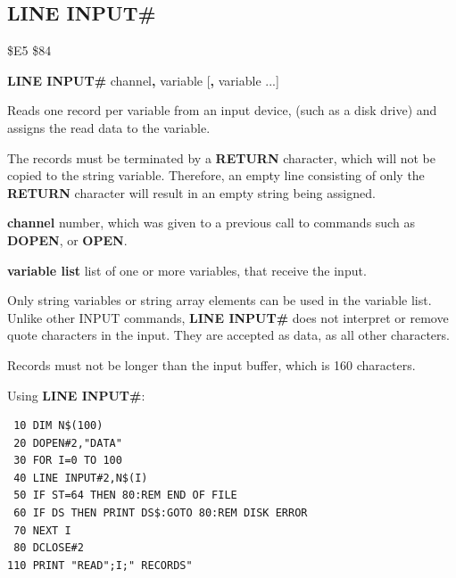 
\newpage
\subsection{LINE INPUT\#}
\begin{description}[leftmargin=2cm,style=nextline]
\item [Token:] \$E5 \$84
\item [Format:] {\bf LINE INPUT\#} channel{\bf,} variable [{\bf,} variable ...]
\item [Usage:] Reads one record per variable from an input device,
               (such as a disk drive)
               and assigns the read data to the variable.

               The records must be terminated by a {\bf RETURN}
               character, which will not be copied to the string variable.
               Therefore, an empty line consisting of only the {\bf RETURN} character
               will result in an empty string being assigned.

               {\bf channel} number, which was given to a previous
               call to commands such as {\bf DOPEN}, or {\bf OPEN}.

               {\bf variable list} list of one or more
               variables, that receive the input.

\item [Remarks:] Only string variables or string array elements
                 can be used in the variable list.
                 Unlike other INPUT commands, {\bf LINE INPUT\#} does
                 not interpret or remove quote characters in the input.
                 They are accepted as data, as all other characters.

                 Records must not be longer than the input buffer, which is 160 characters.

\item [Example:] Using {\bf LINE INPUT\#}:
\begin{tcolorbox}[colback=black,coltext=white]
\verbatimfont{\codefont}
\begin{verbatim}
 10 DIM N$(100)
 20 DOPEN#2,"DATA"
 30 FOR I=0 TO 100
 40 LINE INPUT#2,N$(I)
 50 IF ST=64 THEN 80:REM END OF FILE
 60 IF DS THEN PRINT DS$:GOTO 80:REM DISK ERROR
 70 NEXT I
 80 DCLOSE#2
110 PRINT "READ";I;" RECORDS"
\end{verbatim}
\end{tcolorbox}
\end{description}

